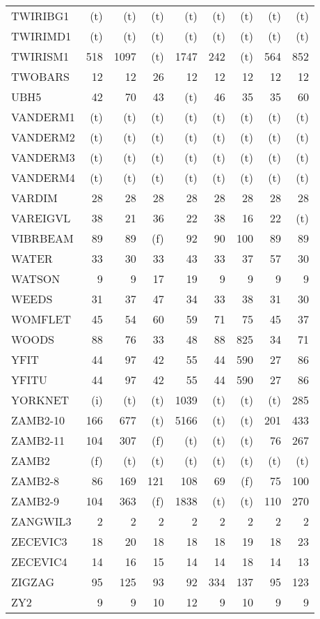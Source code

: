 \documentclass[11pt,twoside]{article}
\begin{document}
{\begin{longtable}[c]{|l|r|r|r|r|r|r|r|r|}
 TWIRIBG1 & (t) & (t) & (t) & (t) & (t) & (t) & (t) & (t) \\
 TWIRIMD1 & (t) & (t) & (t) & (t) & (t) & (t) & (t) & (t) \\
 TWIRISM1 & 518 & 1097 & (t) & 1747 & 242 & (t) & 564 & 852 \\
 TWOBARS & 12 & 12 & 26 & 12 & 12 & 12 & 12 & 12 \\
 UBH5 & 42 & 70 & 43 & (t) & 46 & 35 & 35 & 60 \\
 VANDERM1 & (t) & (t) & (t) & (t) & (t) & (t) & (t) & (t) \\
 VANDERM2 & (t) & (t) & (t) & (t) & (t) & (t) & (t) & (t) \\
 VANDERM3 & (t) & (t) & (t) & (t) & (t) & (t) & (t) & (t) \\
 VANDERM4 & (t) & (t) & (t) & (t) & (t) & (t) & (t) & (t) \\
 VARDIM & 28 & 28 & 28 & 28 & 28 & 28 & 28 & 28 \\
 VAREIGVL & 38 & 21 & 36 & 22 & 38 & 16 & 22 & (t) \\
 VIBRBEAM & 89 & 89 & (f) & 92 & 90 & 100 & 89 & 89 \\
 WATER & 33 & 30 & 33 & 43 & 33 & 37 & 57 & 30 \\
 WATSON & 9 & 9 & 17 & 19 & 9 & 9 & 9 & 9 \\
 WEEDS & 31 & 37 & 47 & 34 & 33 & 38 & 31 & 30 \\
 WOMFLET & 45 & 54 & 60 & 59 & 71 & 75 & 45 & 37 \\
 WOODS & 88 & 76 & 33 & 48 & 88 & 825 & 34 & 71 \\
 YFIT & 44 & 97 & 42 & 55 & 44 & 590 & 27 & 86 \\
 YFITU & 44 & 97 & 42 & 55 & 44 & 590 & 27 & 86 \\
 YORKNET & (i) & (t) & (t) & 1039 & (t) & (t) & (t) & 285 \\
 ZAMB2-10 & 166 & 677 & (t) & 5166 & (t) & (t) & 201 & 433 \\
 ZAMB2-11 & 104 & 307 & (f) & (t) & (t) & (t) & 76 & 267 \\
 ZAMB2 & (f) & (t) & (t) & (t) & (t) & (t) & (t) & (t) \\
 ZAMB2-8 & 86 & 169 & 121 & 108 & 69 & (f) & 75 & 100 \\
 ZAMB2-9 & 104 & 363 & (f) & 1838 & (t) & (t) & 110 & 270 \\
 ZANGWIL3 & 2 & 2 & 2 & 2 & 2 & 2 & 2 & 2 \\
 ZECEVIC3 & 18 & 20 & 18 & 18 & 18 & 19 & 18 & 23 \\
 ZECEVIC4 & 14 & 16 & 15 & 14 & 14 & 18 & 14 & 13 \\
 ZIGZAG & 95 & 125 & 93 & 92 & 334 & 137 & 95 & 123 \\
 ZY2 & 9 & 9 & 10 & 12 & 9 & 10 & 9 & 9 \\
\end{longtable}
}
\end{document}
